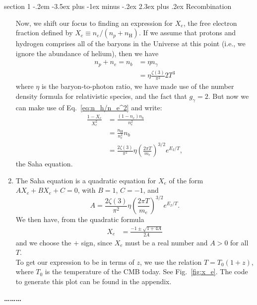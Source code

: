 \documentclass[12pt]{article}
\makeatletter
\newenvironment{problem}{\@startsection
	{section}
	{1}
	{-.2em}
	{-3.5ex plus -1ex minus -.2ex}
	{2.3ex plus .2ex}
	{\pagebreak[3]%
		\large\bf\noindent{Problem }
	}
}
{%
	\begin{center}\large\bf \ldots\ldots\ldots\end{center}}
\makeatother
\begin{document}
\begin{problem}{Recombination}
\begin{enumerate}
			Now, we shift our focus to finding an expression for $X_e$, the free electron fraction defined by $X_e \equiv n_e/(n_p + n_\mathrm{H})$.  If we assume that protons and hydrogen comprises all of the baryons in the Universe at this point (i.e., we ignore the abundance of helium), then we have \begin{align*}
				n_p + n_e = n_b &= \eta n_\gamma
				\\
				&= \eta \frac{\zeta(3)}{\pi^2}2 T^3
			\end{align*} where $\eta$ is the baryon-to-photon ratio, we have made use of the number density formula for relativistic species, and the fact that $g_\gamma = 2$.  But now we can make use of Eq.~\ref{eq:n_h/n_e^2} and write: \begin{align*}
				\frac{1 - X_e}{X_e^2} &= \frac{(1 - n_e) n_b}{n_e^2}
				\\
				&= \frac{n_\mathrm{H}}{n_e^2}n_b
				\\
				&=\frac{2\zeta(3)}{\pi^2} \eta  \left(  \frac{ 2\pi T}{m_e}\right)^{3/2} e^{E_I/T},
			\end{align*} the Saha equation.
			
			\item The Saha equation is a quadratic equation for $X_e$ of the form $AX_e + BX_e + C = 0$, with $B = 1$, $C=-1$, and \begin{equation*}
				A= \frac{2\zeta(3)}{\pi^2} \eta  \left(  \frac{ 2\pi T}{m_e}\right)^{3/2} e^{E_I/T}.
			\end{equation*} We then have, from the quadratic formula \begin{align*}
				X_e &= \frac{-1 \pm \sqrt{1 + 4A}}{2A}
			\end{align*} and we choose the $+$ sign, since $X_e$ must be a real number and $A > 0$ for all $T$.\\
			
			To get our expression to be in terms of $z$, we use the relation $T = T_0 (1+z)$, where $T_0$ is the temperature of the CMB today.  See Fig.~\ref*{fig:x_e}.  The code to generate this plot can be found in the appendix.
			

\end{enumerate}
\end{problem}
\end{document}
